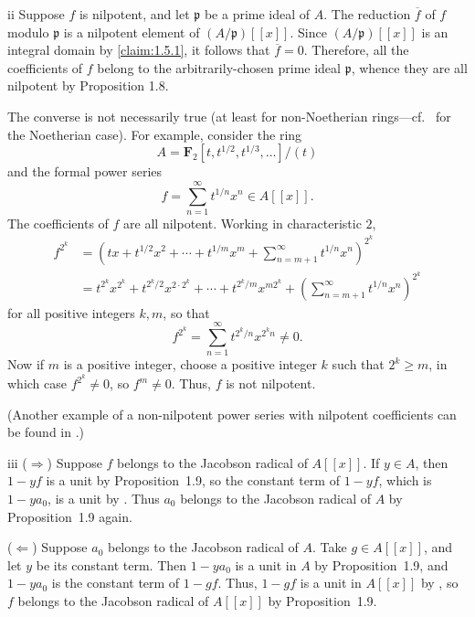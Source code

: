 \begin{partsolution}{ii}
Suppose \(f\) is nilpotent, and let \(\mathfrak p\) be a prime ideal of \(A\).
The reduction \(\overline f\) of \(f\) modulo \(\mathfrak p\) is a nilpotent element of \((A/\mathfrak p)[[x]]\).
Since \((A/\mathfrak p)[[x]]\) is an integral domain by \autoref{claim:1.5.1}, it follows that \(\overline f = 0\).
Therefore, all the coefficients of \(f\) belong to the arbitrarily-chosen prime ideal \(\mathfrak p\), whence they are all nilpotent by Proposition 1.8.

The converse is not necessarily true (at least for non-Noetherian rings---cf.~ for the Noetherian case).
For example, consider the ring
\begin{equation*}
A = \mathbf{F}_2[t, t^{1/2}, t^{1/3}, \ldots]/(t)
\end{equation*}
and the formal power series
\begin{equation*}
f = \sum_{n=1}^\infty t^{1/n} x^n \in A[[x]].
\end{equation*}
The coefficients of \(f\) are all nilpotent.
Working in characteristic \(2\),
\begin{align*}
f^{2^k}
&= \left(t x + t^{1/2} x^2 + \cdots + t^{1/m} x^m + \sum_{n = m + 1}^\infty t^{1/n} x^n\right)^{2^k}
\\&= t^{2^k} x^{2^k} + t^{2^k / 2} x^{2\cdot2^k} + \cdots + t^{2^k / m} x^{m 2^k} + \left(\sum_{n = m+1}^\infty t^{1/n} x^n\right)^{2^k}
\end{align*}
for all positive integers \(k, m\), so that
\begin{equation*}
f^{2^k}
= \sum_{n=1}^\infty t^{2^k/n} x^{2^k n} \neq 0.
\end{equation*}
Now if \(m\) is a positive integer, choose a positive integer \(k\) such that \(2^k \geq m\), in which case \(f^{2^k} \neq 0\), so \(f^m \neq 0\).
Thus, \(f\) is not nilpotent.

(Another example of a non-nilpotent power series with nilpotent coefficients can be found in \cite[Example 2]{FieldsZeroDivisors}.)
\end{partsolution}

\begin{partsolution}{iii}
(\(\Rightarrow\))
Suppose \(f\) belongs to the Jacobson radical of \(A[[x]]\).
If \(y \in A\), then \(1 - y f\) is a unit by Proposition~1.9, so the constant term of \(1 - y f\), which is \(1 - y a_0\), is a unit by .
Thus \(a_0\) belongs to the Jacobson radical of \(A\) by Proposition~1.9 again.

(\(\Leftarrow\))
Suppose \(a_0\) belongs to the Jacobson radical of \(A\).
Take \(g \in A[[x]]\), and let \(y\) be its constant term.
Then \(1 - y a_0\) is a unit in \(A\) by Proposition~1.9, and \(1 - y a_0\) is the constant term of \(1 - g f\).
Thus, \(1 - g f\) is a unit in \(A[[x]]\) by , so \(f\) belongs to the Jacobson radical of \(A[[x]]\) by Proposition~1.9.
\end{partsolution}

